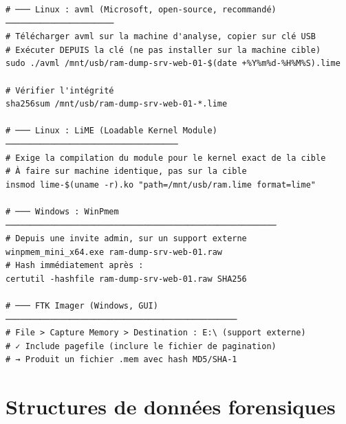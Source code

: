 \begin{lstlisting}[style=StyleTerminal,
  caption={Acquisition mémoire vive --- Linux (avml) et Windows (WinPmem)},
  label={lst:ram-acquisition}]
# ─── Linux : avml (Microsoft, open-source, recommandé) ──────────────────────
# Télécharger avml sur la machine d'analyse, copier sur clé USB
# Exécuter DEPUIS la clé (ne pas installer sur la machine cible)
sudo ./avml /mnt/usb/ram-dump-srv-web-01-$(date +%Y%m%d-%H%M%S).lime

# Vérifier l'intégrité
sha256sum /mnt/usb/ram-dump-srv-web-01-*.lime

# ─── Linux : LiME (Loadable Kernel Module) ───────────────────────────────────
# Exige la compilation du module pour le kernel exact de la cible
# À faire sur machine identique, pas sur la cible
insmod lime-$(uname -r).ko "path=/mnt/usb/ram.lime format=lime"

# ─── Windows : WinPmem ───────────────────────────────────────────────────────
# Depuis une invite admin, sur un support externe
winpmem_mini_x64.exe ram-dump-srv-web-01.raw
# Hash immédiatement après :
certutil -hashfile ram-dump-srv-web-01.raw SHA256

# ─── FTK Imager (Windows, GUI) ───────────────────────────────────────────────
# File > Capture Memory > Destination : E:\ (support externe)
# ✓ Include pagefile (inclure le fichier de pagination)
# → Produit un fichier .mem avec hash MD5/SHA-1
\end{lstlisting}

\section{Structures de données forensiques}
\label{sec:forensics-data}

